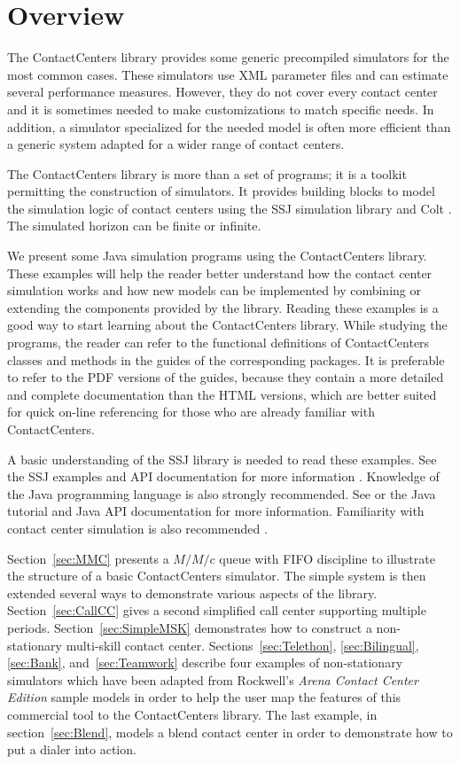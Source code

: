 \section*{Overview}

The ContactCenters library provides some generic precompiled simulators for the
most common cases.
These simulators use XML parameter files and can
estimate several performance measures.
However, they do not cover
every contact center and it is sometimes needed to make
customizations to match specific needs.
In addition,
a simulator specialized for the needed model is often more efficient
than a generic system adapted for a wider range of contact centers.

The ContactCenters library is more than a set of
programs; it is a toolkit permitting the construction of simulators.
It provides building blocks to model the simulation
logic of contact centers using the SSJ simulation library \cite{iLEC04j} and
Colt \cite{iHOS02a}.  The simulated horizon can be finite or
infinite.

We present some Java simulation programs using the ContactCenters
library.  These examples will help the reader better
understand how the contact center simulation works and how new models
can be implemented by combining or extending the components provided
by the library.  Reading these examples is a good way to start learning about
the ContactCenters library.
While studying the programs, the reader can refer to the functional 
definitions of ContactCenters classes and methods in the guides of the 
corresponding packages.
It is preferable to refer to the PDF versions of the guides,
because they contain a more detailed and complete documentation
than the HTML versions, which are better suited for quick
on-line referencing for those who are already familiar with
ContactCenters.

A basic understanding
of the SSJ library is needed to read these examples.  See the SSJ
examples and API documentation for more information \cite{iLEC04j}.
Knowledge
of the Java programming language is also strongly recommended.
See \cite{iFLA99a} or the Java tutorial and Java API documentation for
more information.
Familiarity with contact center simulation is also recommended
\cite{ccGAN02a,ccMEH03a}.

Section~\ref{sec:MMC} presents a $M/M/c$ queue with
FIFO discipline
to illustrate the structure of a basic ContactCenters simulator.
The simple system is then extended several ways to demonstrate various
aspects of the library.
Section~\ref{sec:CallCC} gives a second simplified call center
supporting multiple periods.
Section~\ref{sec:SimpleMSK} demonstrates how to construct a
non-stationary multi-skill contact center.
Sections~\ref{sec:Telethon}, \ref{sec:Bilingual}, \ref{sec:Bank},
and~\ref{sec:Teamwork} describe four
examples of non-stationary simulators which have been adapted from
Rockwell's
\emph{Arena Contact Center Edition}
sample models in order to help the user map the features of this
commercial tool to the ContactCenters library.
The last example, in section~\ref{sec:Blend}, models a blend contact
center in order to demonstrate how to put a dialer into action.

